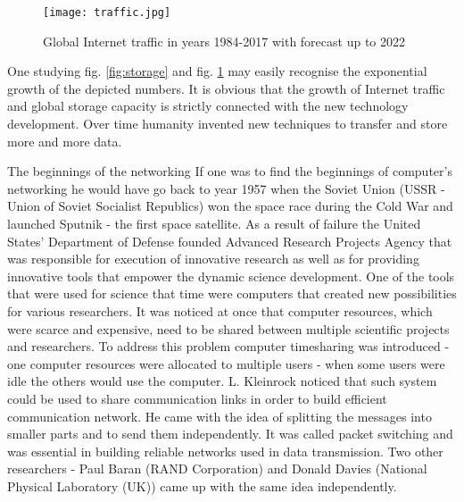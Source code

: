 \documentclass[magisterska,en]{pracamgr}
\begin{document}
\begin{figure}[h]
    \centering
    \texttt{[image: traffic.jpg]}
    \caption{Global Internet traffic in years 1984-2017 with forecast up to 2022}
    \label{fig:traffic}
\end{figure}

One studying fig. \ref{fig:storage} and fig. \ref{fig:traffic} may easily recognise the exponential growth of the depicted numbers. It is obvious that the growth of Internet traffic and global storage capacity is strictly connected with the new technology development. Over time humanity invented new techniques to transfer and store more and more data.



The beginnings of the networking
If one was to find the beginnings of computer's networking he would have go back to year 1957 when the Soviet Union (USSR - Union of Soviet Socialist Republics) won the space race during the Cold War and launched Sputnik - the first space satellite. As a result of failure the United States' Department of Defense founded Advanced Research Projects Agency that was responsible for execution of innovative research as well as for providing innovative tools that empower the dynamic science development.\cite{Internet_History_article} One of the tools that were used for science that time were computers that created new possibilities for various researchers. It was noticed at once that computer resources, which were scarce and expensive, need to be shared between multiple scientific projects and researchers. To address this problem computer timesharing was introduced - one computer resources were allocated to multiple users - when some users were idle the others would use the computer. L. Kleinrock noticed that such system could be used to share communication links in order to build efficient communication network. He came with the idea of splitting the messages into smaller parts and to send them independently. It was called packet switching and was essential in building reliable networks used in data transmission. Two other researchers - Paul Baran (RAND Corporation) and Donald Davies (National Physical Laboratory (UK)) came up with the same idea independently.
\end{document}
